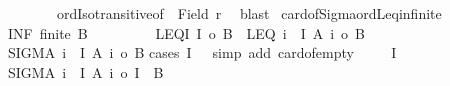 \begin{isabellebody}
\ \ \ \ \ \ \ \ ordIso{\isacharunderscore}{\kern0pt}transitive{\isacharbrackleft}{\kern0pt}of\ {\isacharunderscore}{\kern0pt}\ {\isachardoublequoteopen}{\isacharbar}{\kern0pt}Field\ r{\isacharbar}{\kern0pt}{\isachardoublequoteclose}{\isacharbrackright}{\kern0pt}\ \isamarkupfalse%
\ blast\isanewline
{}\isamarkupfalse%
%
\endisatagproof
{\isafoldproof}%
%
\isadelimproof
\isanewline
%
\endisadelimproof
\isanewline
{}\isamarkupfalse%
\ card{\isacharunderscore}{\kern0pt}of{\isacharunderscore}{\kern0pt}Sigma{\isacharunderscore}{\kern0pt}ordLeq{\isacharunderscore}{\kern0pt}infinite{\isacharcolon}{\kern0pt}\isanewline
{}\ INF{\isacharcolon}{\kern0pt}\ {\isachardoublequoteopen}{\isasymnot}finite\ B{\isachardoublequoteclose}\ \isanewline
\ \ \ \ \ \ \ \ LEQ{\isacharunderscore}{\kern0pt}I{\isacharcolon}{\kern0pt}\ {\isachardoublequoteopen}{\isacharbar}{\kern0pt}I{\isacharbar}{\kern0pt}\ {\isasymle}o\ {\isacharbar}{\kern0pt}B{\isacharbar}{\kern0pt}{\isachardoublequoteclose}\ \ LEQ{\isacharcolon}{\kern0pt}\ {\isachardoublequoteopen}{\isasymforall}i\ {\isasymin}\ I{\isachardot}{\kern0pt}\ {\isacharbar}{\kern0pt}A\ i{\isacharbar}{\kern0pt}\ {\isasymle}o\ {\isacharbar}{\kern0pt}B{\isacharbar}{\kern0pt}{\isachardoublequoteclose}\isanewline
{}\ {\isachardoublequoteopen}{\isacharbar}{\kern0pt}SIGMA\ i\ {\isacharcolon}{\kern0pt}\ I{\isachardot}{\kern0pt}\ A\ i{\isacharbar}{\kern0pt}\ {\isasymle}o\ {\isacharbar}{\kern0pt}B{\isacharbar}{\kern0pt}{\isachardoublequoteclose}\isanewline
%
\isadelimproof
%
\endisadelimproof
%
\isatagproof
{}\isamarkupfalse%
{\isacharparenleft}{\kern0pt}cases\ {\isachardoublequoteopen}I\ {\isacharequal}{\kern0pt}\ {\isacharbraceleft}{\kern0pt}{\isacharbraceright}{\kern0pt}{\isachardoublequoteclose}{\isacharcomma}{\kern0pt}\ simp\ add{\isacharcolon}{\kern0pt}\ card{\isacharunderscore}{\kern0pt}of{\isacharunderscore}{\kern0pt}empty{\isacharparenright}{\kern0pt}\isanewline
\ \ \isamarkupfalse%
\ {\isacharasterisk}{\kern0pt}{\isacharcolon}{\kern0pt}\ {\isachardoublequoteopen}I\ {\isasymnoteq}\ {\isacharbraceleft}{\kern0pt}{\isacharbraceright}{\kern0pt}{\isachardoublequoteclose}\isanewline
\ \ \isamarkupfalse%
\ {\isachardoublequoteopen}{\isacharbar}{\kern0pt}SIGMA\ i\ {\isacharcolon}{\kern0pt}\ I{\isachardot}{\kern0pt}\ A\ i{\isacharbar}{\kern0pt}\ {\isasymle}o\ {\isacharbar}{\kern0pt}I\ {\isasymtimes}\ B{\isacharbar}{\kern0pt}{\isachardoublequoteclose}\isanewline
\ \ \isamarkupfalse%

\end{isabellebody}
